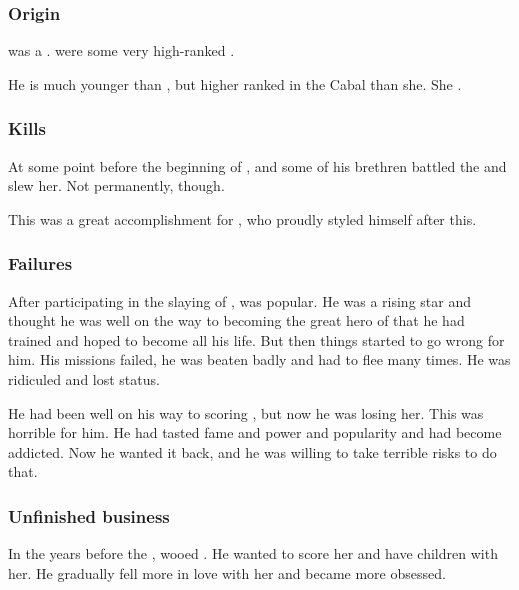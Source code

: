\subsubsection{Origin}
\Teshrial{} was a \ketheran. 
 were some very high-ranked \resphain. 

He is much younger than , but higher ranked in the Cabal than she. 
She .





\subsubsection{Kills \Zessuruch}
At some point before the beginning of \emph{\TwilightAngelRemember{}}, \Teshrial and some of his brethren battled the \dragon {} and slew her. 
Not permanently, though. 

This was a great accomplishment for \Teshrial, who proudly styled himself  after this. 





\subsubsection{Failures}
After participating in the slaying of \Zessuruch, \Teshrial was popular. 
He was a rising star and thought he was well on the way to becoming the great hero of \CiriathSepher that he had trained and hoped to become all his life. 
But then things started to go wrong for him. 
His missions failed, he was beaten badly and had to flee many times. 
He was ridiculed and lost status. 

He had been well on his way to scoring \Firaxel, but now he was losing her. 
This was horrible for him.
He had tasted fame and power and popularity and had become addicted.
Now he wanted it back, and he was willing to take terrible risks to do that.






\subsubsection{Unfinished business}
In the years before the \thirdbanewar, \Teshrial wooed . 
He wanted to score her and have children with her. 
He gradually fell more in love with her and became more obsessed. 

